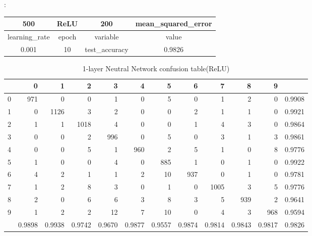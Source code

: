 \documentclass[8pt]{beamer}
\begin{document}
\begin{frame}[allowframebreaks]{\secname : \subsecname}{\subsubsecname}
\begin{table}[htbp]
\begin{tabular}{|c|c|c|c|}
 500 & ReLU & 200 & mean\_squared\_error \\
  \hline
 learning\_rate & epoch & variable & value \\ 

 0.001 &   10 & test\_accuracy & 0.9826 \\ 
   \hline
\end{tabular}
\label{1-layer Neutral Network best hyper-parameter(ReLU)}	
\end{table}



\begin{table}[htbp]
\tiny
  \centering
  \caption{1-layer Neutral Network confusion table(ReLU)}
\begin{tabular}{|r|rrrrrrrrrr|r|}
\hline
  & 0 & 1 & 2 & 3 & 4 & 5 & 6 & 7 & 8 & 9 &  \\
\hline
0 & 971 & 0 & 0 & 1 & 0 & 5 & 0 & 1 & 2 & 0 & 0.9908 \\
1 & 0 & 1126 & 3 & 2 & 0 & 0 & 2 & 1 & 1 & 0 & 0.9921 \\
2 & 1 & 1 & 1018 & 4 & 0 & 0 & 1 & 4 & 3 & 0 & 0.9864 \\
3 & 0 & 0 & 2 & 996 & 0 & 5 & 0 & 3 & 1 & 3 & 0.9861 \\
4 & 0 & 0 & 5 & 1 & 960 & 2 & 5 & 1 & 0 & 8 & 0.9776 \\
5 & 1 & 0 & 0 & 4 & 0 & 885 & 1 & 0 & 1 & 0 & 0.9922 \\
6 & 4 & 2 & 1 & 1 & 2 & 10 & 937 & 0 & 1 & 0 & 0.9781 \\
7 & 1 & 2 & 8 & 3 & 0 & 1 & 0 & 1005 & 3 & 5 & 0.9776 \\
8 & 2 & 0 & 6 & 6 & 3 & 8 & 3 & 5 & 939 & 2 & 0.9641 \\
9 & 1 & 2 & 2 & 12 & 7 & 10 & 0 & 4 & 3 & 968 & 0.9594 \\
\hline
  & 0.9898 & 0.9938 & 0.9742 & 0.9670 & 0.9877 & 0.9557 & 0.9874 & 0.9814 & 0.9843 & 0.9817 & 0.9826 \\
\hline
\end{tabular}%
\label{1-layer Neutral Network confusion table(ReLU)}%
\end{table}%
\end{frame}
\end{document}
